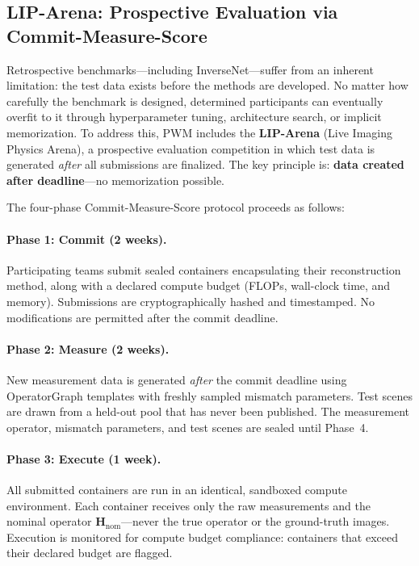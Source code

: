 
\subsection{LIP-Arena: Prospective Evaluation via Commit-Measure-Score}
\label{sec:lip_arena}

Retrospective benchmarks---including InverseNet---suffer from an
inherent limitation: the test data exists before the methods are
developed.
No matter how carefully the benchmark is designed, determined
participants can eventually overfit to it through hyperparameter tuning,
architecture search, or implicit memorization.
To address this, PWM includes the \textbf{LIP-Arena} (Live Imaging Physics Arena), a prospective evaluation competition in which test
data is generated \emph{after} all submissions are finalized.
The key principle is: \textbf{data created after deadline}---no
memorization possible.

The four-phase Commit-Measure-Score protocol proceeds as follows:

\paragraph{Phase 1: Commit (2 weeks).}
Participating teams submit sealed containers encapsulating their
reconstruction method, along with a declared compute budget (FLOPs,
wall-clock time, and memory).
Submissions are cryptographically hashed and timestamped.
No modifications are permitted after the commit deadline.

\paragraph{Phase 2: Measure (2 weeks).}
New measurement data is generated \emph{after} the commit deadline
using OperatorGraph templates with freshly sampled mismatch parameters.
Test scenes are drawn from a held-out pool that has never been
published.
The measurement operator, mismatch parameters, and test scenes are
sealed until Phase~4.

\paragraph{Phase 3: Execute (1 week).}
All submitted containers are run in an identical, sandboxed compute
environment.
Each container receives only the raw measurements and the nominal
operator $\mathbf{H}_{\mathrm{nom}}$---never the true operator or the
ground-truth images.
Execution is monitored for compute budget compliance:
containers that exceed their declared budget are flagged.

